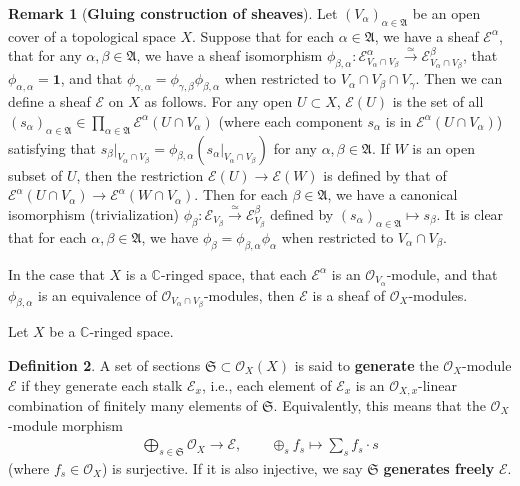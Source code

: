 \documentclass[12pt,b5paper,notitlepage]{report}
\theoremstyle{definition}
\newtheorem{df}{Definition}[section]
\newtheorem{rem}[df]{Remark}
\theoremstyle{plain}
\newcommand{\fk}{\mathfrak}
\newcommand{\id}{\mathbf{1}}
\newcommand{\scr}{\mathscr}
\newcommand{\Cbb}{\mathbb C}
\numberwithin{equation}{section}
\begin{document}
\begin{rem}[\textbf{Gluing construction of sheaves}]\label{lb12}
Let $(V_\alpha)_{\alpha\in\fk A}$ be an open cover of a topological space $X$. Suppose that for each $\alpha\in\fk A$, we have a sheaf $\scr E^\alpha$, that for any $\alpha,\beta\in\fk A$, we have a sheaf isomorphism $\phi_{\beta,\alpha}:\scr E^\alpha_{V_\alpha\cap V_\beta}\xrightarrow{\simeq}\scr E^\beta_{V_\alpha\cap V_\beta}$, that $\phi_{\alpha,\alpha}=\id$, and that $\phi_{\gamma,\alpha}=\phi_{\gamma,\beta}\phi_{\beta,\alpha}$ when restricted to $V_\alpha\cap V_\beta\cap V_\gamma$. Then we can define a sheaf $\scr E$ on $X$ as follows. For any open $U\subset X$, $\scr E(U)$ is the set of all $(s_\alpha)_{\alpha\in\fk A}\in\prod_{\alpha\in\fk A}\scr E^\alpha(U\cap V_\alpha)$ (where each component $s_\alpha$ is in $\scr E^\alpha(U\cap V_\alpha)$) satisfying that $s_\beta|_{V_\alpha\cap V_\beta}=\phi_{\beta,\alpha}(s_\alpha|_{V_\alpha\cap V_\beta})$ for any $\alpha,\beta\in\fk A$. If $W$ is an open subset of $U$, then the restriction $\scr E(U)\rightarrow\scr E(W)$ is defined by that of $\scr E^\alpha(U\cap V_\alpha)\rightarrow \scr E^\alpha(W\cap V_\alpha)$. Then for each $\beta\in\fk A$, we have a canonical isomorphism (trivialization) $\phi_\beta:\scr E_{V_\beta}\xrightarrow{\simeq} \scr E^\beta_{V_\beta}$ defined by $(s_\alpha)_{\alpha\in\fk A}\mapsto s_\beta$. It is clear that for each $\alpha,\beta\in\fk A$, we have $\phi_\beta=\phi_{\beta,\alpha}\phi_\alpha$ when restricted to $V_\alpha\cap V_\beta$.

In the case that $X$ is a $\Cbb$-ringed space, that each $\scr E^\alpha$ is an $\scr O_{V_\alpha}$-module, and that $\phi_{\beta,\alpha}$ is an equivalence of $\scr O_{V_\alpha\cap V_\beta}$-modules, then $\scr E$ is a sheaf of $\scr O_X$-modules. \hfill\qedsymbol
\end{rem}







Let $X$ be a $\Cbb$-ringed space.
\begin{df}
A set of sections $\fk S\subset\scr O_X(X)$ is said to \textbf{generate} the $\scr O_X$-module $\scr E$ if they generate each stalk $\scr E_x$, i.e., each element of $\scr E_x$ is an $\scr O_{X,x}$-linear combination of finitely many elements of $\fk S$. Equivalently, this means that the $\scr O_X$-module morphism
\begin{align}
\bigoplus_{s\in\fk S}\scr O_X\rightarrow\scr E,\qquad \oplus_s f_s\mapsto \sum_s f_s\cdot s 
\end{align}
(where $f_s\in \scr O_X$) is surjective. If it is also injective, we say $\fk S$ \textbf{generates freely} $\scr E$.
\end{df}
\end{document}
